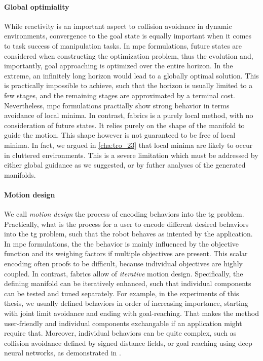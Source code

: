 \paragraph{Global optimiality}
\label{par:discussion_global_optimiality}

While reactivity is an important aspect to collision
avoidance in dynamic environments, convergence to the goal
state is equally important when it comes to task success of
manipulation tasks. In \ac{mpc} formulations, future states
are considered when constructing the optimization problem,
thus the evolution and, importantly, goal approaching is
optimized over the entire horizon. In the extreme, an
infinitely long horizon would lead to a globally optimal
solution. This is practically impossible to achieve, such
that the horizon is usually limited to a few stages, and the
remaining stages are approximated by a terminal cost.
Nevertheless, \ac{mpc} formulations practially show strong 
behavior in terms avoidance of local minima. In contrast,
\ac{fabrics} is a purely local method, with no consideration
of future states. It relies purely on the shape of the
manifold to guide the motion. This shape however is not
guaranteed to be free of local minima. In fact, we argued in 
\cref{cha:tro_23} that local minima are likely to occur in
cluttered environments. This is a severe limitation which
must be addressed by either global guidance as we suggested,
or by futher analyses of the generated manifolds.

\paragraph{Motion design}
\label{par:motion_design}

We call \textit{motion design} the process of encoding
behaviors into the \ac{tg} problem. Practically, what is the
process for a user to encode different desired behaviors
into the \ac{tg} problem, such that the robot behaves as
intented by the application. In \ac{mpc} formulations, the 
the behavior is mainly influenced by the objective function
and its weighing factors if multiple objectives are present.
This scalar encoding often proofs to be difficult, because
individual objectives are highly coupled. In contrast,
\ac{fabrics} allow of \textit{iterative} motion design.
Specifically, the defining manifold can be iteratively
enhanced, such that individual components can be tested and
tuned separately. For example, in the experiments of this
thesis, we usually defined behaviors in order of
increasing importance, starting with joint limit avoidance
and ending with goal-reaching. That makes the method
user-friendly and individual components exchangable if an
application might require that. Moreover, individual
behaviors can be quite complex, such as collision avoidance
defined by signed distance fields, or goal reaching using
deep neural networks, as demonstrated in \cite{xie2023neural}.

